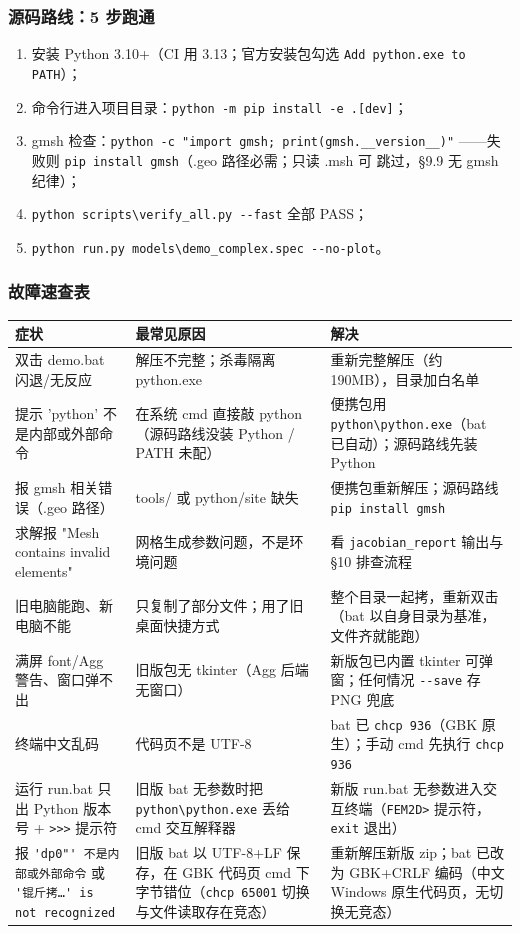 \documentclass[12pt,a4paper]{ctexart}
\newcommand{\fem}{\Verb}
\begin{document}
\subsubsection{源码路线：5 步跑通}

\begin{enumerate}[leftmargin=*]
  \item 安装 Python 3.10+（CI 用 3.13；官方安装包勾选
        \texttt{Add python.exe to PATH}）；
  \item 命令行进入项目目录：\fem|python -m pip install -e .[dev]|；
  \item gmsh 检查：\fem|python -c "import gmsh; print(gmsh.__version__)"|
        ——失败则 \fem|pip install gmsh|（.geo 路径必需；只读 .msh 可
        跳过，§9.9 无 gmsh 纪律）；
  \item \fem|python scripts\verify_all.py --fast| 全部 PASS；
  \item \fem|python run.py models\demo_complex.spec --no-plot|。
\end{enumerate}

\subsubsection{故障速查表}

\begin{longtable}{p{4.8cm}p{4.7cm}p{4.7cm}}
\toprule
\textbf{症状} & \textbf{最常见原因} & \textbf{解决} \\
\midrule
双击 demo.bat 闪退/无反应 & 解压不完整；杀毒隔离 python.exe & 重新完整解压（约 190MB），目录加白名单 \\
提示 'python' 不是内部或外部命令 & 在系统 cmd 直接敲 python（源码路线没装 Python / PATH 未配） & 便携包用 \fem|python\python.exe|（bat 已自动）；源码路线先装 Python \\
报 gmsh 相关错误（.geo 路径） & tools/ 或 python/site 缺失 & 便携包重新解压；源码路线 \fem|pip install gmsh| \\
求解报 "Mesh contains invalid elements" & 网格生成参数问题，不是环境问题 & 看 \fem|jacobian_report| 输出与 §10 排查流程 \\
旧电脑能跑、新电脑不能 & 只复制了部分文件；用了旧桌面快捷方式 & 整个目录一起拷，重新双击（bat 以自身目录为基准，文件齐就能跑） \\
满屏 font/Agg 警告、窗口弹不出 & 旧版包无 tkinter（Agg 后端无窗口） & 新版包已内置 tkinter 可弹窗；任何情况 \fem|--save| 存 PNG 兜底 \\
终端中文乱码 & 代码页不是 UTF-8 & bat 已 \fem|chcp 936|（GBK 原生）；手动 cmd 先执行 \fem|chcp 936| \\
运行 run.bat 只出 Python 版本号 + \fem|>>>| 提示符 & 旧版 bat 无参数时把 \fem|python\python.exe| 丢给 cmd 交互解释器 & 新版 run.bat 无参数进入交互终端（\fem|FEM2D>| 提示符，\fem|exit| 退出） \\
报 \fem|'dp0"' 不是内部或外部命令| 或 \fem|'锟斤拷…' is not recognized| & 旧版 bat 以 UTF-8+LF 保存，在 GBK 代码页 cmd 下字节错位（\fem|chcp 65001| 切换与文件读取存在竞态） & 重新解压新版 zip；bat 已改为 GBK+CRLF 编码（中文 Windows 原生代码页，无切换无竞态） \\
\bottomrule
\end{longtable}
\end{document}
